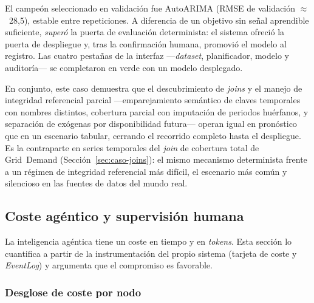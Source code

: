 El campeón seleccionado en validación fue AutoARIMA (RMSE de validación $\approx$~28,5),
estable entre repeticiones. A diferencia de un objetivo sin señal aprendible suficiente,
\emph{superó} la puerta de evaluación determinista: el sistema ofreció la puerta de
despliegue y, tras la confirmación humana, promovió el modelo al registro. Las cuatro
pestañas de la interfaz —\textit{dataset}, planificador, modelo y auditoría— se completaron
en verde con un modelo desplegado.

En conjunto, este caso demuestra que el descubrimiento de \textit{joins} y el manejo de
integridad referencial parcial —emparejamiento semántico de claves temporales con nombres
distintos, cobertura parcial con imputación de periodos huérfanos, y separación de exógenas
por disponibilidad futura— operan igual en pronóstico que en un escenario tabular, cerrando
el recorrido completo hasta el despliegue. Es la contraparte en series temporales del
\textit{join} de cobertura total de Grid~Demand (Sección~\ref{sec:caso-joins}): el mismo
mecanismo determinista frente a un régimen de integridad referencial más difícil, el
escenario más común y silencioso en las fuentes de datos del mundo real.

\subsection{Coste agéntico y supervisión humana}
\label{sec:coste-agente}

La inteligencia agéntica tiene un coste en tiempo y en \textit{tokens}. Esta sección lo
cuantifica a partir de la instrumentación del propio sistema (tarjeta de coste y
\textit{EventLog}) y argumenta que el compromiso es favorable.


\subsubsection{Desglose de coste por nodo}
\label{sec:coste-desglose}

